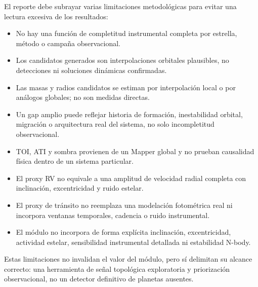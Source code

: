 El reporte debe subrayar varias limitaciones metodol\'ogicas para evitar una lectura excesiva de los resultados:

\begin{itemize}
\item No hay una funci\'on de completitud instrumental completa por estrella, m\'etodo o campa\~na observacional.
\item Los candidatos generados son interpolaciones orbitales plausibles, no detecciones ni soluciones din\'amicas confirmadas.
\item Las masas y radios candidatos se estiman por interpolaci\'on local o por an\'alogos globales; no son medidas directas.
\item Un gap amplio puede reflejar historia de formaci\'on, inestabilidad orbital, migraci\'on o arquitectura real del sistema, no solo incompletitud observacional.
\item TOI, ATI y sombra provienen de un Mapper global y no prueban causalidad f\'isica dentro de un sistema particular.
\item El proxy RV no equivale a una amplitud de velocidad radial completa con inclinaci\'on, excentricidad y ruido estelar.
\item El proxy de tr\'ansito no reemplaza una modelaci\'on fotom\'etrica real ni incorpora ventanas temporales, cadencia o ruido instrumental.
\item El m\'odulo no incorpora de forma expl\'icita inclinaci\'on, excentricidad, actividad estelar, sensibilidad instrumental detallada ni estabilidad N-body.
\end{itemize}

Estas limitaciones no invalidan el valor del m\'odulo, pero s\'i delimitan su alcance correcto: una herramienta de se\~nal topol\'ogica exploratoria y priorizaci\'on observacional, no un detector definitivo de planetas ausentes.
